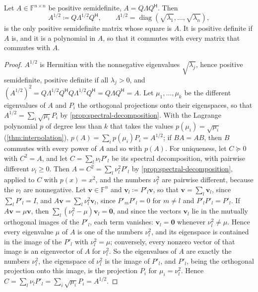 \begin{theorem}
\label{thm:square-root}
Let $A\in\mathbb F^{n\times n}$ be positive semidefinite, $A=Q\Lambda Q^{\mathsf H}$. Then
\[
A^{1/2}\coloneqq Q\Lambda^{1/2}Q^{\mathsf H},\qquad\Lambda^{1/2}=\operatorname{diag}(\sqrt{\lambda_1},\ldots,\sqrt{\lambda_n}),
\]
is the only positive semidefinite matrix whose square is $A$. It is positive definite if $A$ is, and it is a polynomial in $A$, so that it commutes with every matrix that commutes with $A$.
\end{theorem}

\begin{proof}
$A^{1/2}$ is Hermitian with the nonnegative eigenvalues $\sqrt{\lambda_j}$, hence positive semidefinite, positive definite if all $\lambda_j>0$, and $(A^{1/2})^2=Q\Lambda^{1/2}Q^{\mathsf H}Q\Lambda^{1/2}Q^{\mathsf H}=Q\Lambda Q^{\mathsf H}=A$. Let $\mu_1,\ldots,\mu_k$ be the different eigenvalues of $A$ and $P_i$ the orthogonal projections onto their eigenspaces, so that $A^{1/2}=\sum_i\sqrt{\mu_i}P_i$ by \cref{prop:spectral-decomposition}. With the Lagrange polynomial $p$ of degree less than $k$ that takes the values $p(\mu_i)=\sqrt{\mu_i}$ (\cref{thm:interpolation}), $p(A)=\sum_ip(\mu_i)P_i=A^{1/2}$; if $BA=AB$, then $B$ commutes with every power of $A$ and so with $p(A)$. For uniqueness, let $C\succeq0$ with $C^2=A$, and let $C=\sum_l\nu_lP'_l$ be its spectral decomposition, with pairwise different $\nu_l\ge0$. Then $A=C^2=\sum_l\nu_l^2P'_l$ by \cref{prop:spectral-decomposition}, applied to $C$ with $p(x)=x^2$, and the numbers $\nu_l^2$ are pairwise different, because the $\nu_l$ are nonnegative. Let $\mathbf v\in\mathbb F^n$ and $\mathbf v_l\coloneqq P'_l\mathbf v$, so that $\mathbf v=\sum_l\mathbf v_l$, since $\sum_lP'_l=I$, and $A\mathbf v=\sum_l\nu_l^2\mathbf v_l$, since $P'_mP'_l=0$ for $m\ne l$ and $P'_lP'_l=P'_l$. If $A\mathbf v=\mu\mathbf v$, then $\sum_l(\nu_l^2-\mu)\mathbf v_l=\mathbf 0$, and since the vectors $\mathbf v_l$ lie in the mutually orthogonal images of the $P'_l$, each term vanishes: $\mathbf v_l=\mathbf 0$ whenever $\nu_l^2\ne\mu$. Hence every eigenvalue $\mu$ of $A$ is one of the numbers $\nu_l^2$, and its eigenspace is contained in the image of the $P'_l$ with $\nu_l^2=\mu$; conversely, every nonzero vector of that image is an eigenvector of $A$ for $\nu_l^2$. So the eigenvalues of $A$ are exactly the numbers $\nu_l^2$, the eigenspace of $\nu_l^2$ is the image of $P'_l$, and $P'_l$, being the orthogonal projection onto this image, is the projection $P_i$ for $\mu_i=\nu_l^2$. Hence $C=\sum_l\nu_lP'_l=\sum_i\sqrt{\mu_i}P_i=A^{1/2}$.
\end{proof}

